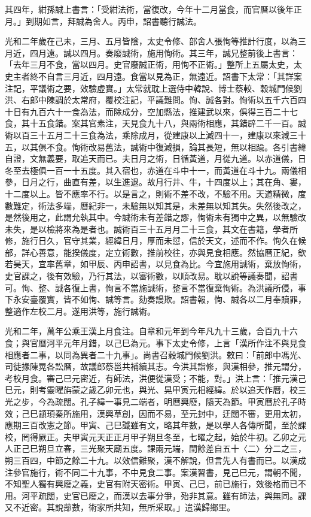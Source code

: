 \begin{pinyinscope}
其四年，紺孫誠上書言：「受紺法術，當復改，今年十二月當食，而官曆以後年正月。」到期如言，拜誠為舍人。丙申，詔書聽行誠法。

光和二年歲在己未，三月、五月皆陰，太史令修、部舍人張恂等推計行度，以為三月近，四月遠。誠以四月。奏廢誠術，施用恂術。其三年，誠兄整前後上書言：「去年三月不食，當以四月。史官廢誠正術，用恂不正術。」整所上五屬太史，太史主者終不自言三月近，四月遠。食當以見為正，無遠近。詔書下太常：「其詳案注記，平議術之要，效驗虛實。」太常就耽上選侍中韓說、博士蔡較、穀城門候劉洪、右郎中陳調於太常府，覆校注記，平議難問。恂、誠各對。恂術以五千六百四十日有九百六十一食為法，而除成分，空加縣法，推建武以來，俱得三百二十七食，其十五食錯。案其官素注，天見食九十八，與兩術相應，其錯辟二千一百。誠術以百三十五月二十三食為法，乘除成月，從建康以上減四十一，建康以來減三十五，以其俱不食。恂術改易舊法，誠術中復減損，論其長短，無以相踰。各引書緯自證，文無義要，取追天而已。夫日月之術，日循黃道，月從九道。以赤道儀，日冬至去極俱一百一十五度。其入宿也，赤道在斗中十一，而黃道在斗十九。兩儀相參，日月之行，曲直有差，以生進退。故月行井、牛，十四度以上；其在角、婁，十二度以上。皆不應率不行。以是言之，則術不差不改，不驗不用。天道精微，度數難定，術法多端，曆紀非一，未驗無以知其是，未差無以知其失。失然後改之，是然後用之，此謂允執其中。今誠術未有差錯之謬，恂術未有獨中之異，以無驗改未失，是以檢將來為是者也。誠術百三十五月月二十三食，其文在書籍，學者所修，施行日久，官守其業，經緯日月，厚而未愆，信於天文，述而不作。恂久在候部，詳心善意，能揆儀度，定立術數，推前校往，亦與見食相應。然協曆正紀，欽若昊天，宜率舊章，如甲辰、丙申詔書，以見食為比。今宜施用誠術，棄放恂術，史官課之，後有效驗，乃行其法，以審術數，以順改易。耽以說等議奏聞，詔書可。恂、整、誠各復上書，恂言不當施誠術，整言不當復棄恂術。為洪議所侵，事下永安臺覆實，皆不如恂、誠等言。劾奏謾欺。詔書報，恂、誠各以二月奉贖罪，整適作左校二月。遂用洪等，施行誠術。

光和二年，萬年公乘王漢上月食注。自章和元年到今年凡九十三歲，合百九十六食；與官曆河平元年月錯，以己巳為元。事下太史令修，上言「漢所作注不與見食相應者二事，以同為異者二十九事」。尚書召穀城門候劉洪。敕曰：「前郎中馮光、司徒掾陳晃各訟曆，故議郎蔡邕共補續其志。今洪其詣修，與漢相參，推元謂分，考校月食。審己巳元密近，有師法，洪便從漢受；不能，對。」洪上言：「推元漢己巳元，則考靈曜旃蒙之歲乙卯元也，與光、晃甲寅元相經緯。於以追天作曆，校三光之步，今為疏闊。孔子緯一事見二端者，明曆興廢，隨天為節。甲寅曆於孔子時效；己巳顓頊秦所施用，漢興草創，因而不易，至元封中，迂闊不審，更用太初，應期三百改憲之節。甲寅、己巳讖雖有文，略其年數，是以學人各傳所聞，至於課校，罔得厥正。夫甲寅元天正正月甲子朔旦冬至，七曜之起，始於牛初。乙卯之元人正己巳朔旦立春，三光聚天廟五度。課兩元端，閏餘差自五十〈二〉分二之三，朔三百四，中節之餘二十九。以效信難聚，漢不解說，但言先人有書而已。以漢成注參官施行，術不同二十九事，不中見食二事。案漢習書，見己巳元，謂朝不聞，不知聖人獨有興廢之義，史官有附天密術。甲寅、己巳，前已施行，效後格而已不用。河平疏闊，史官已廢之，而漢以去事分爭，殆非其意。雖有師法，與無同。課又不近密。其說蔀數，術家所共知，無所采取。」遣漢歸鄉里。


\end{pinyinscope}